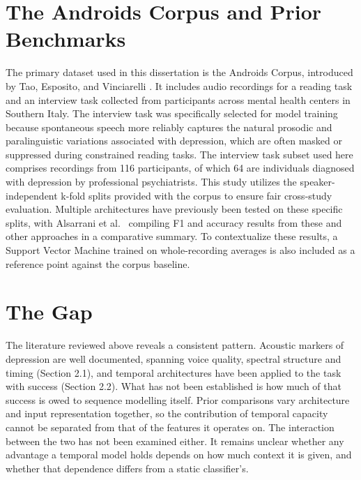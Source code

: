 \documentclass{mproj}
\begin{document}
\section{The Androids Corpus and Prior Benchmarks}\label{sec:corpus-survey}

The primary dataset used in this dissertation is the Androids Corpus, introduced by Tao, Esposito, and Vinciarelli \cite{tao2023androids}. It includes audio recordings for a reading task and an interview task collected from participants across mental health centers in Southern Italy. The interview task was specifically selected for model training because spontaneous speech more reliably captures the natural prosodic and paralinguistic variations associated with depression, which are often masked or suppressed during constrained reading tasks. The interview task subset used here comprises recordings from 116 participants, of which 64 are individuals diagnosed with depression by professional psychiatrists. This study utilizes the speaker-independent k-fold splits provided with the corpus to ensure fair cross-study evaluation. Multiple architectures have previously been tested on these specific splits, with Alsarrani et al.\ \cite{alsarrani2025} compiling F1 and accuracy results from these and other approaches in a comparative summary. To contextualize these results, a Support Vector Machine trained on whole-recording averages is also included as a reference point against the corpus baseline.

\section{The Gap}\label{sec:gap}

The literature reviewed above reveals a consistent pattern. Acoustic markers of depression are well documented, spanning voice quality, spectral structure and timing (Section 2.1), and temporal architectures have been applied to the task with success (Section 2.2). What has not been established is how much of that success is owed to sequence modelling itself. Prior comparisons vary architecture and input representation together, so the contribution of temporal capacity cannot be separated from that of the features it operates on. The interaction between the two has not been examined either. It remains unclear whether any advantage a temporal model holds depends on how much context it is given, and whether that dependence differs from a static classifier's.
\end{document}
